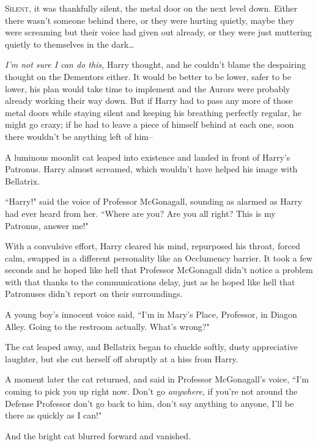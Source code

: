 
\lettrine{S}{ilent,} it was thankfully silent, the metal door on the next level down. Either there wasn't someone behind there, or they were hurting quietly, maybe they were screaming but their voice had given out already, or they were just muttering quietly to themselves in the dark{\ldots}

\emph{I'm not sure I can do this,} Harry thought, and he couldn't blame the despairing thought on the Dementors either. It would be better to be lower, safer to be lower, his plan would take time to implement and the Aurors were probably already working their way down. But if Harry had to pass any more of those metal doors while staying silent and keeping his breathing perfectly regular, he might go crazy; if he had to leave a piece of himself behind at each one, soon there wouldn't be anything left of him\---

A luminous moonlit cat leaped into existence and landed in front of Harry's Patronus. Harry almost screamed, which wouldn't have helped his image with Bellatrix.

``Harry!" said the voice of Professor McGonagall, sounding as alarmed as Harry had ever heard from her. ``Where are you? Are you all right? This is my Patronus, answer me!"

With a convulsive effort, Harry cleared his mind, repurposed his throat, forced calm, swapped in a different personality like an Occlumency barrier. It took a few seconds and he hoped like hell that Professor McGonagall didn't notice a problem with that thanks to the communications delay, just as he hoped like hell that Patronuses didn't report on their surroundings.

A young boy's innocent voice said, ``I'm in Mary's Place, Professor, in Diagon Alley. Going to the restroom actually. What's wrong?"

The cat leaped away, and Bellatrix began to chuckle softly, dusty appreciative laughter, but she cut herself off abruptly at a hiss from Harry.

A moment later the cat returned, and said in Professor McGonagall's voice, ``I'm coming to pick you up right now. Don't go \emph{anywhere}, if you're not around the Defense Professor don't go back to him, don't say anything to anyone, I'll be there as quickly as I can!"

And the bright cat blurred forward and vanished.

